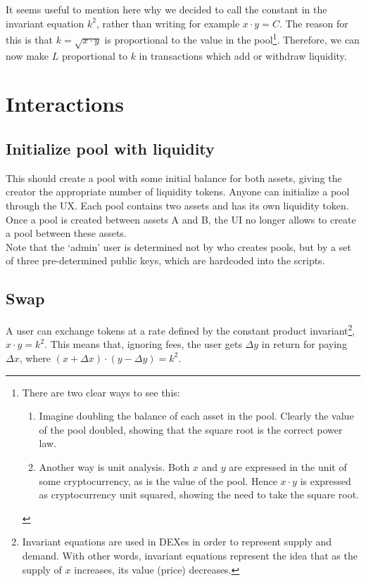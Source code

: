 \documentclass{article}
\begin{document}
It seems useful to mention here why we decided to call the constant in the
invariant equation $k^2$, rather than writing for example $x \cdot y = C$. The
reason for this is that $k = \sqrt{x \cdot y}$ is proportional to the value in
the pool\footnote{
  There are two clear ways to see this:
  \begin{enumerate}
    \item Imagine doubling the balance of each asset in the pool. Clearly
      the value of the pool doubled, showing that the square root is the
      correct power law.
    \item Another way is unit analysis. Both $x$ and $y$ are expressed in
      the unit of some cryptocurrency, as is the value of the pool. Hence $x
      \cdot y$ is expressed as cryptocurrency unit squared, showing the need
      to take the square root.
  \end{enumerate}
}. Therefore, we can now make $L$ proportional to $k$ in transactions which add
or withdraw liquidity.

\section{Interactions}

\subsection{Initialize pool with liquidity}

This should create a pool with some initial balance for both assets, giving the
creator the appropriate number of liquidity tokens. Anyone can initialize a pool
through the UX. Each pool contains two assets and has its own liquidity token.
Once a pool is created between assets A and B, the UI no longer allows to create
a pool between these assets. \\

Note that the `admin' user is determined not by who creates pools, but by a set
of three pre-determined public keys, which are hardcoded into the scripts.

\subsection{Swap}

A user can exchange tokens at a rate defined by the constant product
invariant\footnote{
  Invariant equations are used in DEXes in order to represent supply and demand.
  With other words, invariant equations represent the idea that as the supply of
  $x$ increases, its value (price) decreases.
},
$x \cdot y = k^2$. This means that, ignoring fees, the user gets $\Delta y$ in
return for paying $\Delta x$, where $(x + \Delta x) \cdot (y - \Delta y) = k^2$.
\\
\end{document}
